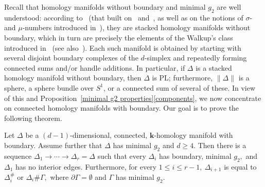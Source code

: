 \documentclass[ALCO,ThmDefs,Unicode,epreuves]{cedram}
\newcommand{\field}{\mathbf{k}}
\begin{document}
 Recall that homology manifolds without boundary and minimal $g_2$ are well understood: according to~\cite[Theorem~5.3]{Murai-15} (that built on~\cite[Theorem~5.2]{Novik-Swartz-09:Socles} and~\cite[Theorem~1.14]{Bagchi:mu-vector}, as well as on the notions of $\sigma$- and $\mu$-numbers introduced in~\cite{Bagchi-Datta-14}), they are stacked homology manifolds without boundary, which in turn are precisely the elements of the Walkup's class introduced in~\cite{Walkup-70} (see also~\cite[Section~8]{Kalai-87}). Each such manifold is obtained by starting with several disjoint boundary complexes of the $d$-simplex and repeatedly forming connected sums and/or handle additions. In particular, if $\Delta$ is a stacked homology manifold without boundary, then $\Delta$ is PL; furthermore, $\|\Delta\|$ is a sphere, a sphere bundle over $S^1$, or a connected sum of several of these. In view of this and Proposition~\ref{minimal g2 properties}\eqref{components}, 
we now concentrate on connected homology manifolds with boundary. Our goal is to prove the following theorem.

\begin{theorem} \label{global minimal g2}
Let $\Delta$ be a $(d-1)$-dimensional, connected, $\field$-homology manifold with boundary. Assume further that $\Delta$ has minimal $g_2$ and $d \ge 4.$ Then there is a sequence $\Delta_1 \rightarrow \cdots \rightarrow \Delta_r =\Delta$ such that every $\Delta_i$ has boundary, minimal $g_2,$ and $\Delta_1$ has no interior edges. Furthermore, for every $1 \le i \le r-1,~\Delta_{i+1}$ is equal to $\Delta^\#_i$ or $\Delta_i \# \Gamma,$ where $\partial \Gamma = \emptyset$ and $\Gamma$ has minimal $g_2.$ 
\end{theorem}
\end{document}

